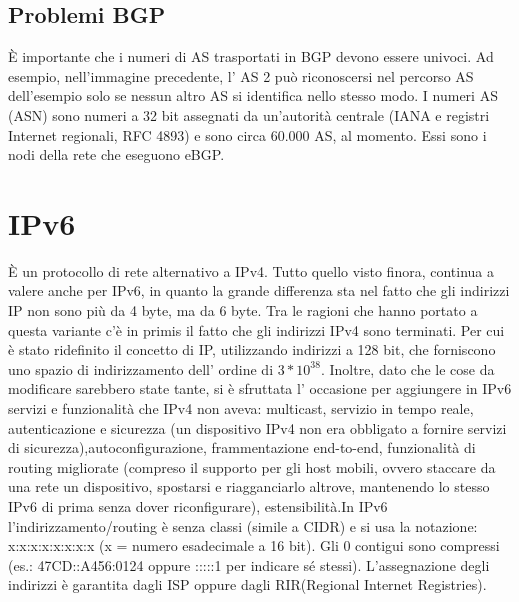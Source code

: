 \subsection{Problemi BGP}
È importante che i numeri di AS trasportati in BGP devono essere univoci. Ad esempio, nell’immagine precedente, l’ AS 2 può riconoscersi nel percorso AS dell’esempio solo se nessun altro AS si identifica nello stesso modo. I numeri AS (ASN) sono numeri a 32 bit assegnati da un’autorità centrale (IANA e registri Internet regionali, RFC 4893) e sono circa 60.000 AS, al momento. Essi sono i nodi della rete che eseguono eBGP.
\section{IPv6}
È un protocollo di rete alternativo a IPv4. Tutto quello visto finora, continua a valere anche per IPv6, in quanto la grande differenza sta nel fatto che gli indirizzi IP non sono più da 4 byte, ma da 6 byte. Tra le ragioni che hanno portato a questa variante c’è in primis il fatto che gli indirizzi IPv4 sono terminati. Per cui è stato ridefinito il concetto di IP, utilizzando indirizzi a 128 bit, che forniscono uno spazio di indirizzamento dell’ ordine di $3*10^{38}$. Inoltre, dato che le cose da modificare sarebbero state tante, si è sfruttata l’ occasione per aggiungere in IPv6 servizi e funzionalità che IPv4 non aveva: multicast, servizio in tempo reale, autenticazione e sicurezza (un dispositivo IPv4 non era obbligato a fornire servizi di sicurezza),autoconfigurazione, frammentazione end-to-end, funzionalità di routing migliorate (compreso il supporto per gli host mobili, ovvero staccare da una rete un dispositivo, spostarsi e riagganciarlo altrove, mantenendo lo stesso IPv6 di prima senza dover riconfigurare), estensibilità.In IPv6 l’indirizzamento/routing è senza classi (simile a CIDR) e si usa la notazione: x:x:x:x:x:x:x:x (x = numero esadecimale a 16 bit). Gli 0 contigui sono compressi (es.: 47CD::A456:0124 oppure :::::1 per indicare sé stessi). L’assegnazione degli indirizzi è garantita dagli ISP oppure dagli RIR(Regional Internet Registries).
